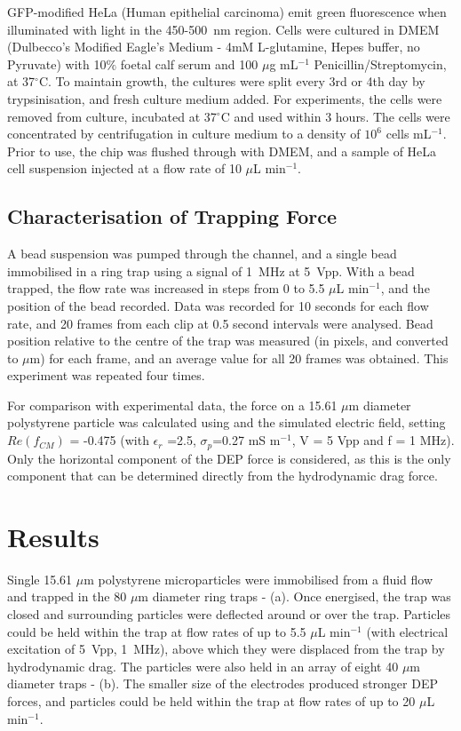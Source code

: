 GFP-modified HeLa (Human epithelial carcinoma) emit green fluorescence when illuminated with light in the 450-500~nm region. Cells were cultured in DMEM (Dulbecco's Modified Eagle's Medium - 4mM L-glutamine, Hepes buffer, no Pyruvate) with 10$\%$ foetal calf serum and 100 $\mu$g mL$^{-1}$ Penicillin/Streptomycin, at 37$^{\circ}$C. To maintain growth, the cultures were split every 3rd or 4th day by trypsinisation, and fresh culture medium added. For experiments, the cells were removed from culture, incubated at 37$^{\circ}$C and used within 3 hours. The cells were concentrated by centrifugation in culture medium to a density of $10^{6}$ cells mL$^{-1}$.  Prior to use, the chip was flushed through with DMEM, and a sample of HeLa cell suspension injected at a flow rate of 10 $\mu$L min$^{-1}$. 

\subsection{Characterisation of Trapping Force}

A bead suspension was pumped through the channel, and a single bead immobilised in a ring trap using a signal of 1~MHz at 5~Vpp. With a bead trapped, the flow rate was increased in steps from 0 to 5.5 $\mu$L min$^{-1}$, and the position of the bead recorded. Data was recorded for 10 seconds for each flow rate, and 20 frames from each clip at 0.5 second intervals were analysed. Bead position relative to the centre of the trap was measured (in pixels, and converted to $\mu$m) for each frame, and an average value for all 20 frames was obtained.  This experiment was repeated four times.   

For comparison with experimental data, the force on a 15.61 $\mu$m diameter polystyrene particle was calculated using  and the simulated electric field, setting $Re(f_{CM})$ = -0.475 (with $\epsilon_{r}$ =2.5, $\sigma_{p}$=0.27 mS m$^{-1}$, V = 5 Vpp and f = 1 MHz). Only the horizontal component of the DEP force is considered, as this is the only component that can be determined directly from the hydrodynamic drag force. 

\section{Results}

Single 15.61 $\mu$m polystyrene microparticles were immobilised from a fluid flow and trapped in the 80 $\mu$m diameter ring traps -  (a). Once energised, the trap was closed and surrounding particles were deflected around or over the trap. Particles could be held within the trap at flow rates of up to 5.5 $\mu$L min$^{-1}$ (with electrical excitation of 5~Vpp, 1~MHz), above which they were displaced from the trap by hydrodynamic drag. The particles were also held in an array of eight 40 $\mu$m diameter traps -  (b). The smaller size of the electrodes produced stronger DEP forces, and particles could be held within the trap at flow rates of up to 20 $\mu$L min$^{-1}$. 

